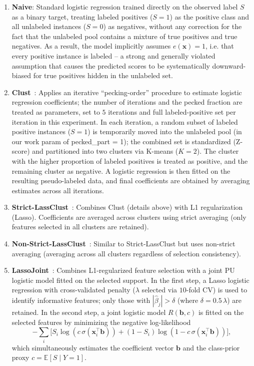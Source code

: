 \documentclass[applsci,article,submit,pdftex,moreauthors]{Definitions/mdpi}
\begin{document}
\begin{enumerate}
\item \textbf{Naive}: Standard logistic regression trained directly on the observed label $S$ as a binary target, treating labeled positives ($S=1$) as the positive class and all unlabeled instances ($S=0$) as negatives, without any correction for the fact that the unlabeled pool contains a mixture of true positives and true negatives. As a result, the model implicitly assumes $e(\mathbf{x}) = 1$, i.e. that every positive instance is labeled -- a strong and generally violated assumption that causes the predicted scores to be systematically downward-biased for true positives hidden in the unlabeled set.

\item \textbf{Clust}~\cite{mdai25_mvc}: Applies an iterative ``pecking-order'' procedure to estimate logistic regression coefficients; the number of iterations and the pecked fraction are treated as parameters, set to $5$ iterations and full labeled-positive set per iteration in this experiment. In each iteration, a random subset of labeled positive instances ($S=1$) is temporarily moved into the unlabeled pool (in our work param of pecked\_part = 1); the combined set is standardized (Z-score) and partitioned into two clusters via K-means ($K=2$). The cluster with the higher proportion of labeled positives is treated as positive, and the remaining cluster as negative. A logistic regression is then fitted on the resulting pseudo-labeled data, and final coefficients are obtained by averaging estimates across all iterations.

\item \textbf{Strict-LassClust}~\cite{mdai25_mvc}: Combines Clust (details above) with L1 regularization (Lasso). Coefficients are averaged across clusters using strict averaging (only features selected in all clusters are retained).

\item \textbf{Non-Strict-LassClust}~\cite{mdai25_mvc}: Similar to Strict-LassClust but uses non-strict averaging (averaging across all clusters regardless of selection consistency).

\item \textbf{LassoJoint}~\cite{lassojoint}: Combines L1-regularized feature selection with a joint PU logistic model fitted on the selected support. In the first step, a Lasso logistic regression with cross-validated penalty ($\lambda$ selected via $10$-fold CV) is used to identify informative features; only those with $|\hat{\beta}_j| > \delta$ (where $\delta = 0.5\,\lambda$) are retained. In the second step, a joint logistic model $R(\mathbf{b}, c)$ is fitted on the selected features by minimizing the negative log-likelihood \[ -\sum_i\bigl[S_i \log(c\,\sigma(\mathbf{x}_i^\top \mathbf{b})) + (1-S_i)\log(1 - c\,\sigma(\mathbf{x}_i^\top \mathbf{b}))\bigr], \] which simultaneously estimates the coefficient vector $\mathbf{b}$ and the class-prior proxy $c = \mathbb{E}[S \mid Y=1]$.


\end{enumerate}
\end{document}
